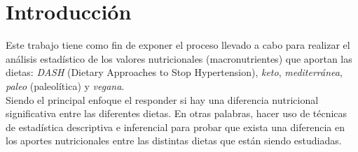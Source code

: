 \documentclass[12pt,a4paper]{article}
\begin{document}
\newpage

\tableofcontents

\newpage

\section{Introducción}
Este trabajo tiene como fin de exponer el proceso llevado a cabo para 
realizar el análisis estadístico de los valores nutricionales (macronutrientes) 
que aportan las dietas: \emph{DASH} (Dietary Approaches to Stop Hypertension), 
\emph{keto}, \emph{mediterránea}, \emph{paleo} (paleolítica) y \emph{vegana}.\\

Siendo el principal enfoque el responder si hay una diferencia nutricional 
significativa entre las diferentes dietas. En otras palabras, hacer uso de 
técnicas de estadística descriptiva e inferencial para probar que exista 
una diferencia en los aportes nutricionales entre las distintas dietas que 
están siendo estudiadas.
\end{document}

